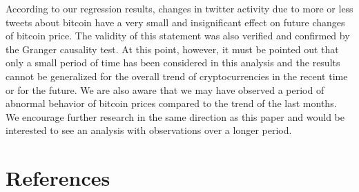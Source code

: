 \documentclass[a4paper,american,12pt]{article}
\begin{document}
\begin{spacing}{1.2}
According to our regression results, changes in twitter activity due to more or less tweets about bitcoin have a very small and insignificant effect on future changes of bitcoin price. The validity of this statement was also verified and confirmed by the Granger causality test. At this point, however, it must be pointed out that only a small period of time has been considered in this analysis and the results cannot be generalized for the overall trend of cryptocurrencies in the recent time or for the future. We are also aware that we may have observed a period of abnormal behavior of bitcoin prices compared to the trend of the last months.\\

We encourage further research in the same direction as this paper and would be interested to see an analysis with observations over a longer period. 


\clearpage
		
\end{spacing}

\clearpage

\section{References}
\printbibliography[heading=none]

\clearpage

\end{document}
